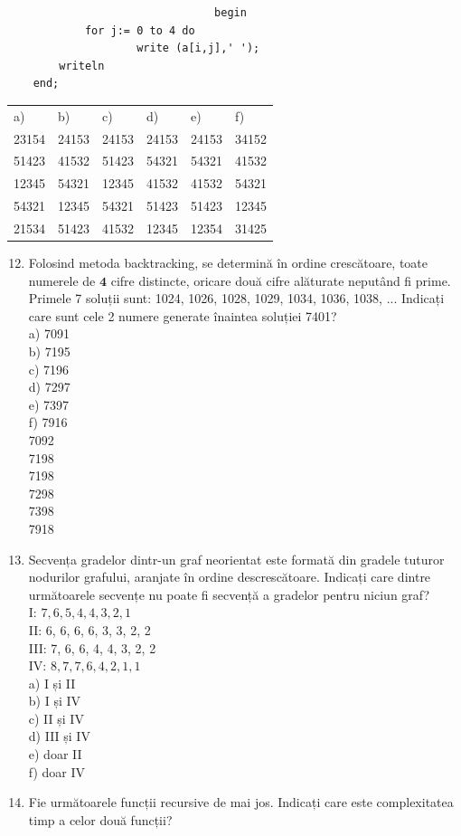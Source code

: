 \documentclass[10pt]{article}
\begin{document}
\begin{verbatim}
                                begin
            for j:= 0 to 4 do
                    write (a[i,j],' ');
        writeln
    end;
\end{verbatim}

\begin{center}
\begin{tabular}{llllll}
a) & b) & c) & d) & e) & f) \\
23154 & 24153 & 24153 & 24153 & 24153 & 34152 \\
51423 & 41532 & 51423 & 54321 & 54321 & 41532 \\
12345 & 54321 & 12345 & 41532 & 41532 & 54321 \\
54321 & 12345 & 54321 & 51423 & 51423 & 12345 \\
21534 & 51423 & 41532 & 12345 & 12354 & 31425 \\
\end{tabular}
\end{center}

\begin{enumerate}
  \setcounter{enumi}{11}
  \item Folosind metoda backtracking, se determină în ordine crescătoare, toate numerele de $\mathbf{4}$ cifre distincte, oricare două cifre alăturate neputând fi prime. Primele 7 soluții sunt: 1024, 1026, 1028, 1029, 1034, 1036, 1038, ... Indicați care sunt cele 2 numere generate înaintea soluției 7401?\\
a) 7091\\
b) 7195\\
c) 7196\\
d) 7297\\
e) 7397\\
f) 7916\\
7092\\
7198\\
7198\\
7298\\
7398\\
7918
  \item Secvența gradelor dintr-un graf neorientat este formată din gradele tuturor nodurilor grafului, aranjate în ordine descrescătoare. Indicați care dintre următoarele secvențe nu poate fi secvență a gradelor pentru niciun graf?\\
I: $7,6,5,4,4,3,2,1$\\
II: 6, 6, 6, 6, 3, 3, 2, 2\\
III: 7, 6, 6, 4, 4, 3, 2, 2\\
IV: $8,7,7,6,4,2,1,1$\\
a) I și II\\
b) I și IV\\
c) II și IV\\
d) III și IV\\
e) doar II\\
f) doar IV
  \item Fie următoarele funcții recursive de mai jos. Indicați care este complexitatea timp a celor două funcții?
\end{enumerate}
\end{document}
